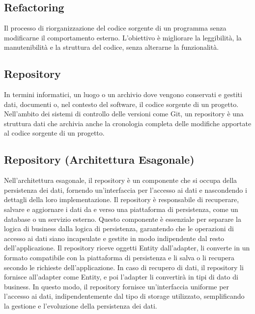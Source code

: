 \newpage



\section{}

\hypertarget{sec:refactoring}{}
\subsection*{Refactoring}
Il processo di riorganizzazione del codice sorgente di un programma senza modificarne il comportamento esterno. L'obiettivo è 
migliorare la leggibilità, la manutenibilità e la struttura del codice, senza alterarne la funzionalità.

\subsection*{Repository}
In termini informatici, un luogo o un archivio dove vengono conservati e gestiti dati, documenti o, nel contesto del software, il codice sorgente di un 
progetto. Nell'ambito dei sistemi di controllo delle versioni come Git, un repository è una struttura dati che archivia anche la cronologia completa delle 
modifiche apportate al codice sorgente di un progetto.

\hypertarget{sec:repository_arch_esagonale}{}
\subsection*{Repository (Architettura Esagonale)}
Nell'architettura esagonale, il repository è un componente che si occupa della persistenza dei dati, fornendo un'interfaccia per l'accesso ai dati
e nascondendo i dettagli della loro implementazione. Il repository è responsabile di recuperare, salvare e aggiornare i dati da e verso una piattaforma
di persistenza, come un database o un servizio esterno. Questo componente è essenziale per separare la logica di business dalla logica di persistenza,
garantendo che le operazioni di accesso ai dati siano incapsulate e gestite in modo indipendente dal resto dell'applicazione.
Il repository riceve oggetti Entity dall'adapter, li converte in un formato compatibile con la piattaforma di persistenza e li salva o li recupera
secondo le richieste dell'applicazione. In caso di recupero di dati, il repository li fornisce all'adapter come Entity, e poi l'adapter li convertirà in
tipi di dato di business. In questo modo, il repository fornisce un'interfaccia uniforme per l'accesso ai dati, indipendentemente dal
tipo di storage utilizzato, semplificando la gestione e l'evoluzione della persistenza dei dati.

